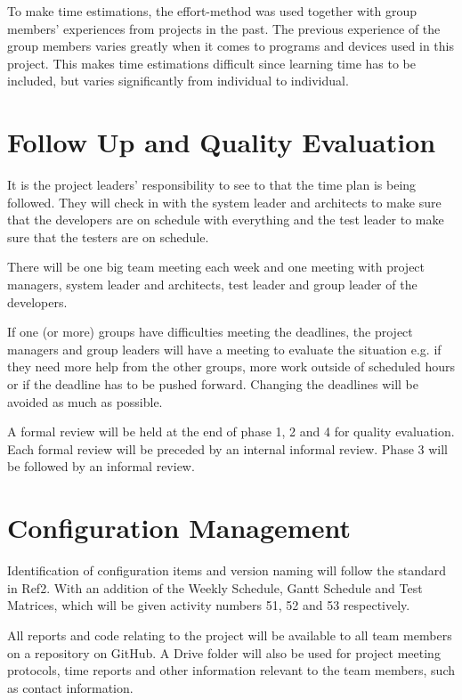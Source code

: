 \documentclass[a4paper]{article}
\begin{document}
To make time estimations, the effort-method was used together with group members' experiences from projects in the past. The previous experience of the group members varies greatly when it comes to programs and devices used in this project. This makes time estimations difficult since learning time has to be included, but varies significantly from individual to individual.

\section{Follow Up and Quality Evaluation}

It is the project leaders' responsibility to see to that the time plan is being followed. They will check in with the system leader and architects to make sure that the developers are on schedule with everything and the test leader to make sure that the testers are on schedule. 

There will be one big team meeting each week and one meeting with project managers, system leader and architects, test leader and group leader of the developers.

If one (or more) groups have difficulties meeting the deadlines, the project managers and group leaders will have a meeting to evaluate the situation e.g. if they need more help from the other groups, more work outside of scheduled hours or if the deadline has to be pushed forward. Changing the deadlines will be avoided as much as possible.

A formal review will be held at the end of phase 1, 2 and 4 for quality evaluation. Each formal review will be preceded by an internal informal review. Phase 3 will be followed by an informal review.

\section{Configuration Management}
Identification of configuration items and version naming will follow the standard in Ref2. With an addition of the Weekly Schedule, Gantt Schedule and Test Matrices, which will be given activity numbers 51, 52 and 53 respectively.

All reports and code relating to the project will be available to all team members on a repository on GitHub. A Drive folder will also be used for project meeting protocols, time reports and other information relevant to the team members, such as contact information.
\end{document}
